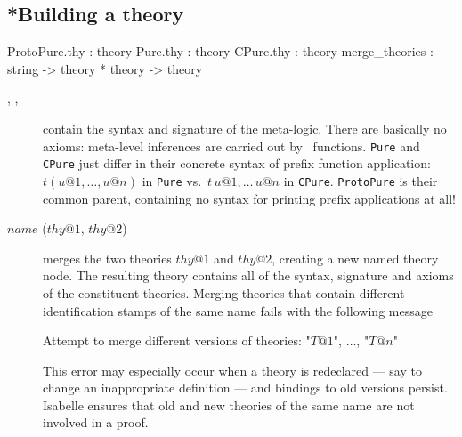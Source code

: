 \subsection{*Building a theory}
\label{BuildingATheory}
\begin{ttbox}
ProtoPure.thy  : theory
Pure.thy       : theory
CPure.thy      : theory
merge_theories : string -> theory * theory -> theory
\end{ttbox}
\begin{description}
\item[, ,
  ] contain the syntax and signature of the
  meta-logic.  There are basically no axioms: meta-level inferences
  are carried out by \ML\ functions.  \texttt{Pure} and \texttt{CPure}
  just differ in their concrete syntax of prefix function application:
  $t(u@1, \ldots, u@n)$ in \texttt{Pure} vs.\ $t\,u@1,\ldots\,u@n$ in
  \texttt{CPure}.  \texttt{ProtoPure} is their common parent,
  containing no syntax for printing prefix applications at all!
  
\item[ $name$ ($thy@1$, $thy@2$)] merges
  the two theories $thy@1$ and $thy@2$, creating a new named theory
  node.  The resulting theory contains all of the syntax, signature
  and axioms of the constituent theories.  Merging theories that
  contain different identification stamps of the same name fails with
  the following message
\begin{ttbox}
Attempt to merge different versions of theories: "\(T@1\)", \(\ldots\), "\(T@n\)"
\end{ttbox}
This error may especially occur when a theory is redeclared --- say to
change an inappropriate definition --- and bindings to old versions
persist.  Isabelle ensures that old and new theories of the same name
are not involved in a proof.

\end{description}


